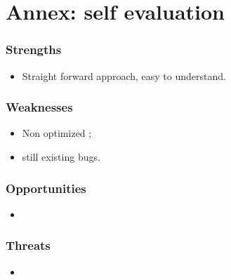 \documentclass[a4paper,11pt]{article}%
\begin{document}
\clearpage %

\appendix %


\section{Annex: self evaluation}

\subsubsection*{Strengths}
\begin{itemize}
\item Straight forward approach, easy to understand.
\end{itemize}

\subsubsection*{Weaknesses}
\begin{itemize}
\item Non optimized ;
\item still existing bugs.
\end{itemize}

\subsubsection*{Opportunities}
\begin{itemize}
\item 
\end{itemize}

\subsubsection*{Threats}
\begin{itemize}
\item 
\end{itemize}
\end{document}
